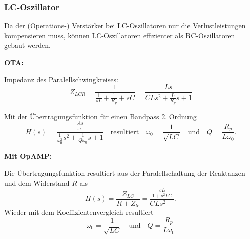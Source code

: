 \subsubsection{LC-Oszillator}
Da der (Operations-) Verstärker bei LC-Oszillatoren nur die Verlustleistungen kompensieren muss, können LC-Oszillatoren effizienter als RC-Oszillatoren gebaut werden.

\textbf{OTA:}

\begin{minipage}{0.4\columnwidth}
    
\end{minipage}
\hfill
\begin{minipage}{0.55\columnwidth}
    Impedanz des Paralellschwingkreises:
    \begin{equation*}
        Z_{LCR}
        = \frac{1}{\frac{1}{s L} + \frac{1}{R_p}+s C}
        = \frac{L s}{C L s^2 + \frac{L}{R_p} s + 1}
    \end{equation*}
\end{minipage}
Mit der Übertragungsfunktion für einen Bandpass 2. Ordnung
\begin{equation*}
    H(s) 
    = \frac{\frac{A s}{\omega_0}}{\frac{1}{\omega_0^2} s^2 + \frac{1}{Q \omega_0} s + 1}
\quad \text{resultiert} \quad
    \omega_0 = \frac{1}{\sqrt{LC}} 
    \quad \text{und} \quad
    Q = \frac{R_p}{L\omega_0}.
\end{equation*}

\textbf{Mit OpAMP:}

\begin{minipage}{0.4\columnwidth}
    
\end{minipage}
\hfill
\begin{minipage}{0.55\columnwidth}
    Die Übertragungsfunktion resultiert aus der Paralellschaltung der Reaktanzen und dem Widerstand $R$ als
    \begin{equation*}
        H(s) 
        = \frac{Z_{LC}}{R+Z_{lc}}
        = \frac{\frac{sL}{1+s^2LC}}{CLs^2 + }.
    \end{equation*}
    Wieder mit dem Koeffizientenvergleich resultiert
    \begin{equation*}
        \omega_0 = \frac{1}{\sqrt{LC}} 
        \quad \text{und} \quad
        Q = \frac{R_p}{L\omega_0}
    \end{equation*}
\end{minipage}


